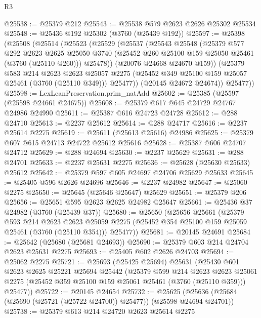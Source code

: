 \begin{lexlean}{R3}
\begin{coremodule}
@25538 := @25379 @212
@25543 := @25538 @579 @2623 @2626 @25302 @25534
@25548 := @25436 @192 @25302 (@3760 (@25439 @192))
@25597 := @25398
    (@25508
      (@25514
        (@25523
          (@25529
            (@25537
              (@25543
                @25548
                (@25379
                  @577
                  @292
                  @2623
                  @2625
                  @25050
                  @3740
                  (@25452 @260 @25100 @159 @25050 @25461 (@3760 (@25110 @260)))
                  @25478))
              (@20076 @24668 @24670 @159))
            (@25379
              @583
              @214
              @2623
              @2623
              @25057
              @2275
              (@25452 @349 @25100 @159 @25057 @25461 (@3760 (@25110 @349)))
              @25477))
          (@20145 @24672 @24674))
        @25477))
@25598 := LexLeanPreservation.prim_natAdd
@25602 := @25385 (@25597 (@25598 @24661 @24675))
@25608 := @25379 @617 @645 @24729 @24767 @24986 @24990
@25611 := @25387 @616 @24723 @24728
@25612 := @288 @24710
@25613 := @2237 @25612
@25614 := @288 @24717
@25616 := @2237 @25614 @2275
@25619 := @25611 (@25613 @25616) @24986
@25625 := @25379 @607 @615 @24713 @24722 @25612 @25616
@25628 := @25387 @606 @24707 @24712
@25629 := @288 @24694
@25630 := @2237 @25629
@25631 := @288 @24701
@25633 := @2237 @25631 @2275
@25636 := @25628 (@25630 @25633) @25612
@25642 := @25379 @597 @605 @24697 @24706 @25629 @25633
@25645 := @25405 @596 @2626 @24696
@25646 := @2237 @24982
@25647 := @25060 @2275
@25650 := @25645 (@25646 @25647) @25629
@25651 := @25379 @206
@25656 := @25651 @595 @2623 @2625 @24982 @25647
@25661 := @25436 @37 @24982 (@3760 (@25439 @37))
@25680 := @25650
    (@25656
      @25661
      (@25379
        @593
        @214
        @2623
        @2623
        @25059
        @2275
        (@25452 @354 @25100 @159 @25059 @25461 (@3760 (@25110 @354)))
        @25477))
@25681 := @20145 @24691
@25684 := @25642 (@25680 (@25681 @24693))
@25690 := @25379 @603 @214 @24704 @2623 @25631 @2275
@25693 := @25405 @602 @2626 @24703
@25694 := @25062 @2275
@25721 := @25693
    (@25425 @25694)
    @25631
    (@25430
      @601
      @2623
      @2625
      @25221
      @25694
      @25442
      (@25379
        @599
        @214
        @2623
        @2623
        @25061
        @2275
        (@25452 @359 @25100 @159 @25061 @25461 (@3760 (@25110 @359)))
        @25477))
@25722 := @20145 @24654
@25732 := @25625 (@25636 (@25684 (@25690 (@25721 (@25722 @24700)) @25477)) (@25598 @24694 @24701))
@25738 := @25379 @613 @214 @24720 @2623 @25614 @2275

\end{coremodule}
\end{lexlean}

